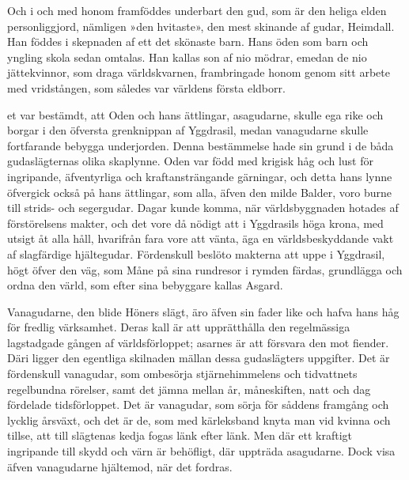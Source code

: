 Och i och med honom framföddes underbart den gud, som är den heliga
elden personliggjord, nämligen »den hvitaste», den mest skinande af
gudar, Heimdall. Han föddes i skepnaden af ett det skönaste barn. Hans
öden som barn och yngling skola sedan omtalas. Han kallas son af nio
mödrar, emedan de nio jättekvinnor, som draga världskvarnen,
frambringade honom genom sitt arbete med vridstången, som således var
världens första eldborr.

\endSecII


\dropcapD et var bestämdt, att Oden och hans ättlingar, asagudarne, skulle ega
rike och borgar i den öfversta grenknippan af Yggdrasil, medan
vanagudarne skulle fortfarande bebygga underjorden. Denna bestämmelse
hade sin grund i de båda gudaslägternas olika skaplynne. Oden var född
med krigisk håg och lust för ingripande, äfventyrliga och
kraftansträngande gärningar, och detta hans lynne öfvergick också på
hans ättlingar, som alla, äfven den milde Balder, voro burne till
strids- och segergudar. Dagar kunde komma, när världsbyggnaden hotades
af förstörelsens makter, och det vore då nödigt att i Yggdrasils höga
krona, med utsigt åt alla håll, hvarifrån fara vore att vänta, äga en
världsbeskyddande vakt af slagfärdige hjältegudar. Fördenskull beslöto
makterna att uppe i Yggdrasil, högt öfver den väg, som Måne på sina
rundresor i rymden färdas, grundlägga och ordna den värld, som efter
sina bebyggare kallas Asgard.

Vanagudarne, den blide Höners slägt, äro äfven sin fader like och hafva
hans håg för fredlig värksamhet. Deras kall är att upprätthålla den
regelmässiga lagstadgade gången af världsförloppet; asarnes är att
försvara den mot fiender. Däri ligger den egentliga skilnaden mällan
dessa gudaslägters uppgifter. Det är fördenskull vanagudar, som
ombesörja stjärnehimmelens och tidvattnets regelbundna rörelser, samt
det jämna mellan år, måneskiften, natt och dag fördelade tidsförloppet.
Det är vanagudar, som sörja för såddens framgång och lycklig årsväxt,
och det är de, som med kärleksband knyta man vid kvinna och tillse, att
till slägtenas kedja fogas länk efter länk. Men där ett kraftigt
ingripande till skydd och värn är behöfligt, där uppträda asagudarne.
Dock visa äfven vanagudarne hjältemod, när det fordras.

